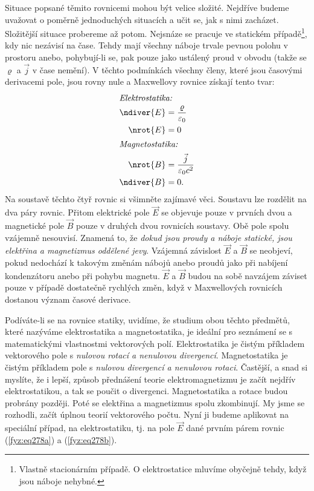     Situace popsané těmito rovnicemi mohou být velice složité. Nejdříve budeme uvažovat o poměrně
    jednoduchých situacích a učit se, jak s nimi zacházet. Složitější situace probereme až potom. 
    Nejsnáze se pracuje ve statickém případě\footnote{Vlastně stacionárním případě. O 
    elektrostatice mluvíme obyčejně tehdy, když jsou náboje nehybné.}, kdy nic nezávisí na čase. 
    Tehdy mají všechny náboje trvale pevnou polohu v prostoru anebo, pohybují-li se, pak pouze jako 
    ustálený proud v obvodu (takže se \(\varrho\) a \(\vec{j}\) v čase nemění). V těchto podmínkách 
    všechny členy, které jsou časovými derivacemi pole, jsou rovny nule a Maxwellovy rovnice 
    získají tento tvar:
    \begin{subequations}\label{fyz:eq278}
      \begin{align}
       \shortintertext{\emph{Elektrostatika:}} 
        \ndiver{E} &=  \frac{\varrho}{\varepsilon_0}    \label{fyz:eq278a}   \\  
          \nrot{E} &= 0                                 \label{fyz:eq278b}   \\
        \shortintertext{\emph{Magnetostatika:}}  
          \nrot{B} &=  \frac{\vec{j}}{\varepsilon_0c^2} \label{fyz:eq278c}   \\
        \ndiver{B} &= 0.                                \label{fyz:eq278d}
      \end{align}
    \end{subequations}
    Na soustavě těchto čtyř rovnic si všimněte zajímavé věci. Soustavu lze rozdělit na dva páry 
    rovnic. Přitom elektrické pole \(\vec{E}\) se objevuje pouze v prvních dvou a magnetické pole 
    \(\vec{B}\) pouze v druhých dvou rovnicích soustavy. Obě pole spolu vzájemně nesouvisí. Znamená 
    to, že \emph{dokud jsou proudy a náboje statické, jsou elektřina a magnetizmus oddělené jevy}. 
    Vzájemná závislost \(\vec{E}\) a \(\vec{B}\) se neobjeví, pokud nedochází k takovým změnám 
    nábojů anebo proudů jako při nabíjení kondenzátoru anebo při pohybu magnetu. \(\vec{E}\) a 
    \(\vec{B}\) budou na sobě navzájem záviset pouze v případě dostatečně rychlých změn, když v 
    Maxwellových rovnicích dostanou význam časové derivace.
     
    Podíváte-li se na rovnice statiky, uvidíme, že studium obou těchto předmětů, které nazýváme     
    elektrostatika a magnetostatika, je ideální pro seznámení se s matematickými vlastnostmi 
    vektorových polí. Elektrostatika je čistým příkladem vektorového pole s \emph{nulovou rotací a 
    nenulovou divergencí}. Magnetostatika je čistým příkladem pole s \emph{nulovou divergencí a 
    nenulovou rotaci}. Častější, a snad si myslíte, že i lepší, způsob přednášení teorie 
    elektromagnetizmu je začít nejdřív elektrostatikou, a tak se poučit o divergenci. 
    Magnetostatika a rotace budou probrány později. Poté se elektřina a magnetizmus spolu 
    zkombinují. My jsme se rozhodli, začít úplnou teorií vektorového počtu. Nyní ji budeme 
    aplikovat na speciální případ, na elektrostatiku, tj. na pole \(\vec{E}\) dané prvním párem 
    rovnic (\ref{fyz:eq278a}) a (\ref{fyz:eq278b}).
     
